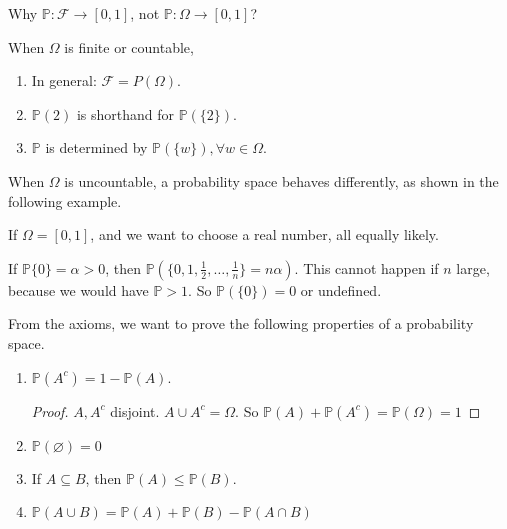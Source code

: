 \begin{problem}
    Why \(\mathbb{P} : \mathcal{F} \to [0,1]\), not \(\mathbb{P}: \Omega \to [0,1]\)?
\end{problem}

\begin{remark}
When \(\Omega\) is finite or countable,
\begin{enumerate}
    \item In general: \(\mathcal{F} = P(\Omega)\).
    \item \(\mathbb{P}(2)\) is shorthand for \(\mathbb{P}(\{2\})\).
    \item \(\mathbb{P}\) is determined by  \(\mathbb{P}(\{w\}), \forall w \in \Omega\).
\end{enumerate}
\end{remark}

\begin{remark}
When \(\Omega\) is uncountable, a probability space behaves differently, as shown in the following example.
\begin{eg}
    If \(\Omega = [0,1]\), and we want to choose a real number, all equally likely.

    If \(\mathbb{P}\{0\} = \alpha > 0\), then \(\mathbb{P}(\{0,1,\frac{1}{2},\ldots ,\frac{1}{n}\} = n\alpha)\). This cannot happen if \(n\) large, because we would have \(\mathbb{P} > 1\). So \(\mathbb{P}(\{0\}) = 0\) or undefined. 
\end{eg}
\end{remark}

\begin{property}
From the axioms, we want to prove the following properties of a probability space.
    \begin{enumerate}
\item \(\mathbb{P}(A^c) = 1 - \mathbb{P}(A)\).
\begin{proof}
    \(A, A^c\) disjoint. \(A \cup A^c = \Omega\). So \(\mathbb{P}(A) + \mathbb{P}(A^c) = \mathbb{P}(\Omega) = 1\) 
\end{proof}
\item \(\mathbb{P}(\varnothing) = 0\)
\item If \(A \subseteq B\), then \(\mathbb{P}(A) \leq \mathbb{P}(B)\).
\item \(\mathbb{P}(A\cup B) = \mathbb{P}(A) + \mathbb{P}(B) - \mathbb{P}(A\cap B)\) 
\end{enumerate}
\end{property}

